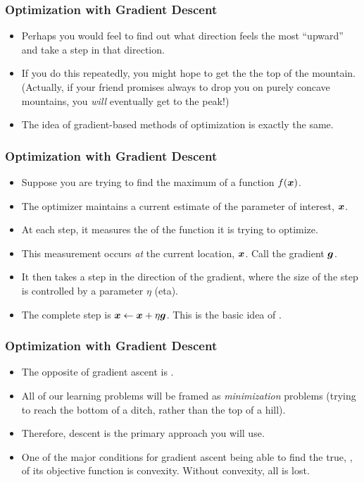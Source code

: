 \documentclass[trans]{beamer}
\begin{document}
\begin{frame}
  \frametitle{Optimization with Gradient Descent}
\begin{itemize}
\item
Perhaps you would feel to find out what direction
feels the most ``upward'' and take a step in that direction. 
\item If you
do this repeatedly, you might hope to get the the top of the mountain.
(Actually, if your friend promises always to drop you on purely
concave mountains, you \emph{will} eventually get to the peak!)
\item
The idea of gradient-based methods of optimization is exactly the
same.
\end{itemize}
\end{frame}

\begin{frame}
  \frametitle{Optimization with Gradient Descent}
\begin{itemize}
\item
  Suppose you are trying to find the maximum of a function
$f({\boldsymbol{x}})$.
\item  The optimizer maintains a current estimate of the parameter
of interest, ${\boldsymbol{x}}$. 
\item At each step, it measures the 
of the function it is trying to optimize. 
\item This measurement occurs
\emph{at} the current location, ${\boldsymbol{x}}$.  Call the gradient ${\boldsymbol{g}}$.
\item  It
then takes a step in the direction of the gradient, where the size of
the step is controlled by a parameter $\eta$ (eta).  
\item The complete step
is ${\boldsymbol{x}} \leftarrow {\boldsymbol{x}} + \eta {\boldsymbol{g}}$.  This is the basic idea of
.
\end{itemize}
\end{frame}

\begin{frame}
  \frametitle{Optimization with Gradient Descent}
\begin{itemize}
\item
The opposite of gradient ascent is .  
\item All of
our learning problems will be framed as \emph{minimization} problems
(trying to reach the bottom of a ditch, rather than the top of a
hill).  
\item Therefore, descent is the primary approach you will use.
\item One of the major conditions for gradient ascent being able to find the
true, , of its objective function is
convexity.  Without convexity, all is lost.
\end{itemize}
\end{frame}
\end{document}
